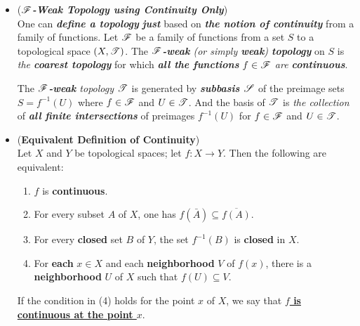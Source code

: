 \documentclass[11pt]{article}
\begin{document}
\begin{itemize}
\item \begin{example} (\emph{\textbf{${\mathscr F}$-Weak Topology using Continuity Only}})\\
One can \emph{\textbf{define a topology}} \emph{\textbf{just}} based on \emph{\textbf{the notion of continuity}} from a family of functions.  Let ${\mathscr F}$ be a family of functions from a set $S$ to a topological  space $(X, {\mathscr T})$. The \emph{\textbf{${\mathscr F}$-weak} (or simply \textbf{weak}) \textbf{topology}} on $S$ is \emph{the \textbf{coarest topology}} for which \emph{\textbf{all the functions} $f \in {\mathscr F}$ are \textbf{continuous}}.   

The \emph{\textbf{${\mathscr F}$-weak} topology ${\mathscr T}$} is generated by \emph{\textbf{subbasis ${\mathscr S}$}} of the preimage sets $S = f^{-1}(U)$ where $f \in {\mathscr F}$ and $U \in {\mathscr T}$. And the basis of ${\mathscr T}$ is \emph{the collection} of \emph{\textbf{all finite intersections}} of preimages $f^{-1}(U)$ for $f \in {\mathscr F}$ and $U \in {\mathscr T}$. 
\end{example}

\item \begin{proposition} (\textbf{Equivalent Definition of Continuity}) \citep{munkres2000topology} \\
Let $X$ and $Y$ be topological spaces; let $f: X \rightarrow Y$. Then the following are equivalent:
\begin{enumerate}
\item $f$ is \textbf{continuous}.
\item For every subset $A$ of $X$, one has $f(\bar{A}) \subseteq \overline{f(A)}$.
\item For every \textbf{closed} set $B$ of $Y$, the set $f^{-1}(B)$ is \textbf{closed} in $X$.
\item For \textbf{each} $x \in X$ and each \textbf{neighborhood} $V$ of $f(x)$, there is a \textbf{neighborhood} $U$ of $X$ such that $f(U) \subseteq V$.
\end{enumerate}
If the condition in (4) holds for the point $x$ of $X$, we say that \underline{\textbf{$f$ is continuous at the point $x$}}.
\end{proposition}
\end{itemize}
\end{document}
